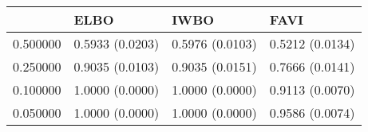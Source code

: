 \begin{tabular}{llll}
\toprule
 & ELBO & IWBO & FAVI \\
\midrule
0.500000 & 0.5933 (0.0203) & 0.5976 (0.0103) & 0.5212 (0.0134) \\
0.250000 & 0.9035 (0.0103) & 0.9035 (0.0151) & 0.7666 (0.0141) \\
0.100000 & 1.0000 (0.0000) & 1.0000 (0.0000) & 0.9113 (0.0070) \\
0.050000 & 1.0000 (0.0000) & 1.0000 (0.0000) & 0.9586 (0.0074) \\
\bottomrule
\end{tabular}
